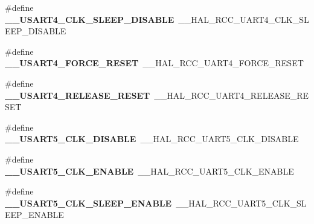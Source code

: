 \begin{DoxyCompactItemize}
\item 
\mbox{\label{group___h_a_l___r_c_c___aliased_ga521d2e55e5207d611debbe98b2a7a22e}} 
\#define {\bfseries \+\_\+\+\_\+\+U\+S\+A\+R\+T4\+\_\+\+C\+L\+K\+\_\+\+S\+L\+E\+E\+P\+\_\+\+D\+I\+S\+A\+B\+LE}~\+\_\+\+\_\+\+H\+A\+L\+\_\+\+R\+C\+C\+\_\+\+U\+A\+R\+T4\+\_\+\+C\+L\+K\+\_\+\+S\+L\+E\+E\+P\+\_\+\+D\+I\+S\+A\+B\+LE
\item 
\mbox{\label{group___h_a_l___r_c_c___aliased_ga342c60e019e63a7d8e932557a6dfc35a}} 
\#define {\bfseries \+\_\+\+\_\+\+U\+S\+A\+R\+T4\+\_\+\+F\+O\+R\+C\+E\+\_\+\+R\+E\+S\+ET}~\+\_\+\+\_\+\+H\+A\+L\+\_\+\+R\+C\+C\+\_\+\+U\+A\+R\+T4\+\_\+\+F\+O\+R\+C\+E\+\_\+\+R\+E\+S\+ET
\item 
\mbox{\label{group___h_a_l___r_c_c___aliased_ga3381ddee2f7d2103d68173317808e96e}} 
\#define {\bfseries \+\_\+\+\_\+\+U\+S\+A\+R\+T4\+\_\+\+R\+E\+L\+E\+A\+S\+E\+\_\+\+R\+E\+S\+ET}~\+\_\+\+\_\+\+H\+A\+L\+\_\+\+R\+C\+C\+\_\+\+U\+A\+R\+T4\+\_\+\+R\+E\+L\+E\+A\+S\+E\+\_\+\+R\+E\+S\+ET
\item 
\mbox{\label{group___h_a_l___r_c_c___aliased_gadca81993c4e9a134d292ee509f2108da}} 
\#define {\bfseries \+\_\+\+\_\+\+U\+S\+A\+R\+T5\+\_\+\+C\+L\+K\+\_\+\+D\+I\+S\+A\+B\+LE}~\+\_\+\+\_\+\+H\+A\+L\+\_\+\+R\+C\+C\+\_\+\+U\+A\+R\+T5\+\_\+\+C\+L\+K\+\_\+\+D\+I\+S\+A\+B\+LE
\item 
\mbox{\label{group___h_a_l___r_c_c___aliased_gad959221f7e570f55a18bc2bf2e849b06}} 
\#define {\bfseries \+\_\+\+\_\+\+U\+S\+A\+R\+T5\+\_\+\+C\+L\+K\+\_\+\+E\+N\+A\+B\+LE}~\+\_\+\+\_\+\+H\+A\+L\+\_\+\+R\+C\+C\+\_\+\+U\+A\+R\+T5\+\_\+\+C\+L\+K\+\_\+\+E\+N\+A\+B\+LE
\item 
\mbox{\label{group___h_a_l___r_c_c___aliased_gab2e735cf263fe2d66068649c893f9421}} 
\#define {\bfseries \+\_\+\+\_\+\+U\+S\+A\+R\+T5\+\_\+\+C\+L\+K\+\_\+\+S\+L\+E\+E\+P\+\_\+\+E\+N\+A\+B\+LE}~\+\_\+\+\_\+\+H\+A\+L\+\_\+\+R\+C\+C\+\_\+\+U\+A\+R\+T5\+\_\+\+C\+L\+K\+\_\+\+S\+L\+E\+E\+P\+\_\+\+E\+N\+A\+B\+LE
\item 
\mbox{\label{group___h_a_l___r_c_c___aliased_ga3ebcd8aa43ec53601b15d7ddd88c7a5f}} 

\end{DoxyCompactItemize}
